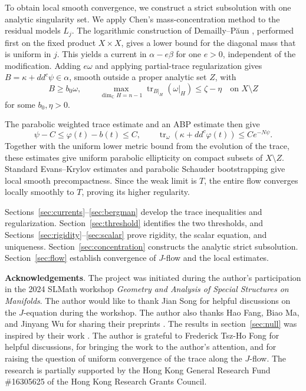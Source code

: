 \documentclass[reqno]{amsart}
\numberwithin{equation}{section}
\theoremstyle{definition}
\DeclareMathOperator{\tr}{tr}
\newcommand{\ddc}{dd^c}
\begin{document}
To obtain local smooth convergence, we construct
a strict subsolution with one analytic singularity set. We apply
Chen's mass-concentration method \cite{C21} to the residual
models $L_j$. The logarithmic construction of Demailly--P\u{a}un
\cite{DP04}, performed first on the fixed product $X\times X$, gives
a lower bound for the diagonal mass that is uniform in $j$. This
yields a current in $\alpha-e\beta$ for one $e>0$, independent of the
modification. Adding $e\omega$ and applying partial-trace
regularization gives $B=\kappa+\ddc\psi\in\alpha$, smooth outside a
proper analytic set $Z$, with
\[
 B\ge b_0\omega,\qquad
 \max_{\dim_{\mathbb C}H=n-1}
      \tr_{B|_H}(\omega|_H)\le\zeta-\eta
 \quad\text{on }X\setminus Z
\]
for some $b_0,\eta>0$.

The parabolic weighted trace estimate \cite{W06,SW08} and an ABP
estimate \cite{S18} then give
\[
 \psi-C\le\varphi(t)-b(t)\le C,\qquad
 \tr_\omega(\kappa+\ddc\varphi(t))\le Ce^{-N\psi}.
\]
Together with the uniform lower metric bound from the evolution of
the trace, these estimates give uniform parabolic ellipticity on
compact subsets of $X\setminus Z$. Standard Evans--Krylov estimates
and parabolic Schauder bootstrapping give local
smooth precompactness.
Since the weak limit is $T$, the entire flow converges locally
smoothly to $T$, proving its higher regularity.


Sections~\ref{sec:currents}--\ref{sec:bergman} develop the
trace inequalities and regularization.
Section~\ref{sec:threshold} identifies the two thresholds,
and Sections~\ref{sec:rigidity}--\ref{sec:scalar} prove
rigidity, the scalar equation, and uniqueness.
Section~\ref{sec:concentration} constructs the analytic strict
subsolution. Section~\ref{sec:flow}
establish convergence of $J$-flow and the local estimates.

\textbf{Acknowledgements}. The project was initiated during the author's participation in the 2024 SLMath workshop \emph{Geometry and Analysis of Special Structures on Manifolds}. The author would like to thank Jian Song for helpful discussions on the $J$-equation during the workshop. The author also thanks Hao Fang, Biao Ma, and Jinyang Wu for sharing their preprints \cite{FM26,FMW26}. The results in section~\ref{sec:null} was inspired by their work \cite{FM26}.  The author is grateful to Frederick Tsz-Ho Fong for helpful discussions, for bringing the work \cite{J20} to the author's attention, and for raising the question of uniform convergence of the trace along the $J$-flow. The research is partially supported by the Hong Kong General Research Fund \#16305625 of the Hong Kong Research Grants Council.
\end{document}
